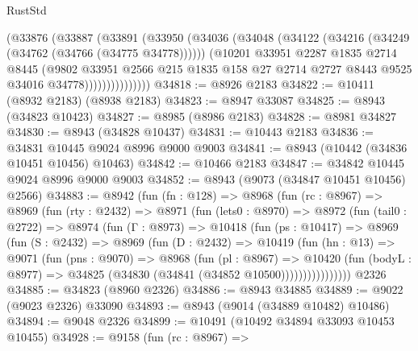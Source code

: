 \begin{lexlean}{RustStd}
\begin{coremodule}
                  (@33876
                    (@33887
                      (@33891
                        (@33950
                          (@34036
                            (@34048
                              (@34122 (@34216 (@34249 (@34762 (@34766 (@34775 @34778))))))
                              (@10201
                                @33951
                                @2287
                                @1835
                                @2714
                                @8445
                                (@9802
                                  @33951
                                  @2566
                                  @215
                                  @1835
                                  @158
                                  @27
                                  @2714
                                  @2727
                                  @8443
                                  @9525
                                  @34016
                                  @34778)))))))))))))))
@34818 := @8926 @2183
@34822 := @10411 (@8932 @2183) (@8938 @2183)
@34823 := @8947 @33087
@34825 := @8943 (@34823 @10423)
@34827 := @8985 (@8986 @2183)
@34828 := @8981 @34827
@34830 := @8943 (@34828 @10437)
@34831 := @10443 @2183
@34836 := @34831 @10445 @9024 @8996 @9000 @9003
@34841 := @8943 (@10442 (@34836 @10451 @10456) @10463)
@34842 := @10466 @2183
@34847 := @34842 @10445 @9024 @8996 @9000 @9003
@34852 := @8943 (@9073 (@34847 @10451 @10456) @2566)
@34883 := @8942
    (fun (fn : @128) =>
    @8968
      (fun (rc : @8967) =>
      @8969
        (fun (rty : @2432) =>
        @8971
          (fun (lets0 : @8970) =>
          @8972
            (fun (tail0 : @2722) =>
            @8974
              (fun (Γ : @8973) =>
              @10418
                (fun (ps : @10417) =>
                @8969
                  (fun (S : @2432) =>
                  @8969
                    (fun (D : @2432) =>
                    @10419
                      (fun (hn : @13) =>
                      @9071
                        (fun (pns : @9070) =>
                        @8968
                          (fun (pl : @8967) =>
                          @10420
                            (fun (bodyL : @8977) =>
                            @34825 (@34830 (@34841 (@34852 @10500))))))))))))))))
    @2326
@34885 := @34823 (@8960 @2326)
@34886 := @8943 @34885
@34889 := @9022 (@9023 @2326) @33090
@34893 := @8943 (@9014 (@34889 @10482) @10486)
@34894 := @9048 @2326
@34899 := @10491 (@10492 @34894 @33093 @10453 @10455)
@34928 := @9158
    (fun (rc : @8967) =>

\end{coremodule}
\end{lexlean}
